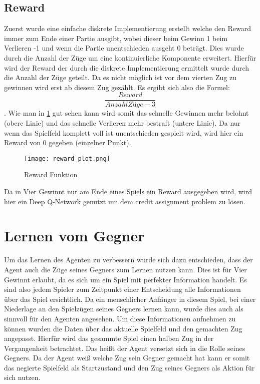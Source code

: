 \subsection{Reward}
 Zuerst wurde eine einfache diskrete Implementierung erstellt welche den Reward immer zum Ende einer Partie ausgibt, wobei dieser beim Gewinn 1 beim Verlieren -1 und wenn die Partie unentschieden ausgeht 0 beträgt.
Dies wurde durch die Anzahl der Züge um eine kontinuierliche Komponente erweitert. Hierfür wird der Reward der durch die diskrete Implementierung ermittelt wurde durch die Anzahl der Züge geteilt. Da es nicht möglich ist vor dem vierten Zug zu gewinnen wird erst ab diesem Zug gezählt. Es ergibt sich also die Formel: $$\frac{Reward}{Anzahl Züge-3}$$.
Wie man in \ref{fig:reward_function} gut sehen kann wird somit das schnelle Gewinnen mehr belohnt (obere Linie) und das schnelle Verlieren mehr bestraft (untere Linie). Da nur wenn das Spielfeld komplett voll ist unentschieden gespielt wird, wird hier ein Reward von 0 gegeben (einzelner Punkt). \\

\begin{figure}[h!]
  \texttt{[image: reward\_plot.png]}
  \centering
  \caption{Reward Funktion}
  \label{fig:reward_function}
\end{figure}
Da in Vier Gewinnt nur am Ende eines Spiels ein Reward ausgegeben wird, wird hier ein Deep Q-Network genutzt um dem credit assignment problem zu lösen.

\section{Lernen vom Gegner}
Um das Lernen des Agenten zu verbessern wurde sich dazu entschieden, dass der Agent auch die Züge seines Gegners zum Lernen nutzen kann. Dies ist für Vier Gewinnt erlaubt, da es sich um ein Spiel mit perfekter Information handelt. Es sind also jedem Spieler zum Zeitpunkt einer Entscheidung alle Informationen über das Spiel ersichtlich. Da ein menschlicher Anfänger in diesem Spiel, bei einer Niederlage an den Spielzügen seines Gegners lernen kann, wurde dies auch als sinnvoll für den Agenten angesehen. Um diese Informationen aufnehmen zu können wurden die Daten über das aktuelle Spielfeld und den gemachten Zug angepasst. Hierfür wird das gesammte Spiel einen halben Zug in der Vergangenheit betrachtet. Das heißt der Agent versetzt sich in die Rolle seines Gegners. Da der Agent weiß welche Zug sein Gegner gemacht hat kann er somit das negierte Spielfeld als Startzustand und den Zug seines Gegners als Aktion für sich nutzen. 


